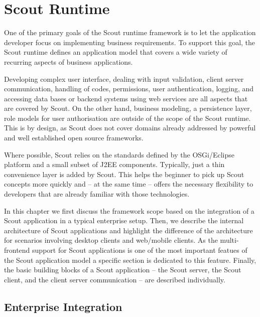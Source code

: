 \documentclass[a4paper,10pt,twoside]{book}
\begin{document}
  \sloppy
\fi


\chapter{Scout Runtime}

One of the primary goals of the Scout runtime framework is to let the application developer focus on implementing business requirements. 
To support this goal, the Scout runtime defines an application model that covers a wide variety of recurring aspects of business applications.

Developing complex user interface, dealing with input validation, client server communication, handling of codes, permissions, user authentication, logging, and accessing data bases or backend systems using web services are all aspects that are covered by Scout.
On the other hand, business modeling, a persistence layer, role models for user authorisation are outside of the scope of the Scout runtime.
This is by design, as Scout does not cover domains already addressed by powerful and well established open source frameworks.

Where possible, Scout relies on the standards defined by the OSGi/Eclipse platform and a small subset of J2EE components. 
Typically, just a thin convenience layer is added by Scout. 
This helps the beginner to pick up Scout concepts more quickly and -- at the same time -- offers the necessary flexibility to developers that are already familiar with those technologies. 

In this chapter we first discuss the framework scope based on the integration of a Scout application in a typical enterprise setup.
Then, we describe the internal architecture of Scout applications and highlight the difference of the architecture for scenarios involving desktop clients and web/mobile clients.
As the multi-frontend support for Scout applications is one of the most important featues of the Scout application model a specific section is dedicated to this feature.
Finally, the basic building blocks of a Scout application -- the Scout server, the Scout client, and the client server communication -- are described individually.


\section{Enterprise Integration}
\end{document}
